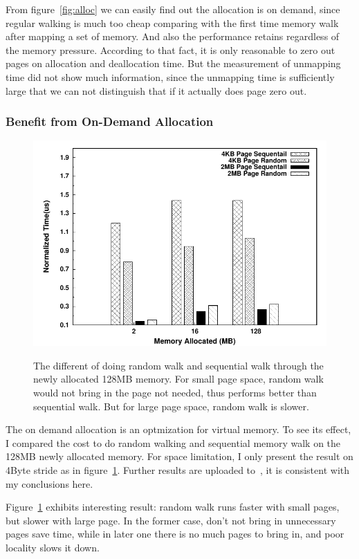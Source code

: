 From figure~\ref{fig:alloc} we can easily find out the allocation is on demand, since regular
walking is much too cheap comparing with the first time memory walk after
mapping a set of memory. And also the performance retains regardless of the
memory pressure. According to that fact, it is only reasonable to zero out
pages on allocation and deallocation time. But the measurement of unmapping
time did not show much information, since the unmapping time is sufficiently
large that we can not distinguish that if it actually does page zero out.

\subsubsection{Benefit from On-Demand Allocation}

\begin{figure}[htb]
\centering
\includegraphics[width=0.8\linewidth]{../figures/on_demand_4k}
\label{fig:on-demand}
\caption{The different of doing random walk and sequential walk through the 
newly allocated 128MB memory. For small page space, random walk would not bring
in the page not needed, thus performs better than sequential walk. But for
large page space, random walk is slower.}
\end{figure}

The on demand allocation is an optmization for virtual memory. To see its
effect, I compared the cost to do random walking and sequential memory walk
on the 128MB newly allocated memory. For space limitation, I only present the
result on 4Byte stride as in figure~\ref{fig:on-demand}. Further results are
uploaded to~\cite{github}, it is consistent with my conclusions here.

Figure~\ref{fig:on-demand} exhibits interesting result: random walk runs
faster with small pages, but slower with large page. In the former case,
don't not bring in unnecessary pages save time, while in later one there
is no much pages to bring in, and poor locality slows it down.

